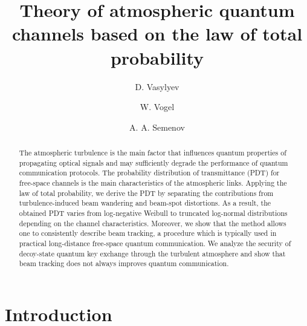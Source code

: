 \documentclass[aps,pra,twocolumn,a4paper,nofootinbib,preprintnumbers] {revtex4-1}
\begin{document}
\title{Theory of atmospheric quantum channels based on the law of total probability}

 \author{D. Vasylyev}

 \author{W. Vogel}

 \author{ A. A. Semenov}
%


\begin{abstract}
	The atmospheric turbulence is the main factor that influences quantum properties of propagating optical signals  and may sufficiently degrade the performance of quantum communication protocols.
	The probability distribution of transmittance (PDT) for free-space channels is the main characteristics of the atmospheric links.
	Applying the law of total probability, we derive the PDT by separating the contributions from turbulence-induced beam wandering and beam-spot distortions.
	As a result, the obtained PDT varies from log-negative Weibull  to truncated log-normal distributions depending on the channel characteristics.
	Moreover, we show that the method allows one to consistently describe beam tracking, a procedure which is  typically used in practical long-distance free-space quantum communication.
	We analyze the security of decoy-state quantum key exchange through the turbulent atmosphere and show that beam tracking does not always improves quantum communication.
\end{abstract}
\pacs{}



\maketitle




\section{Introduction}
\end{document}
